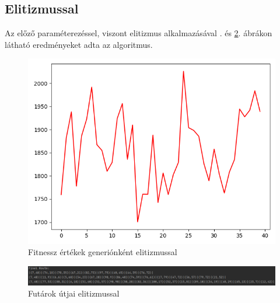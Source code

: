 \subsection{Elitizmussal}

Az előző paraméterezéssel, viszont elitizmus alkalmazásával . és \ref{fig:MTSPMultiDepo2Route}. ábrákon látható eredményeket adta az algoritmus.

\begin{figure}[!htb]
\centering
\includegraphics[scale=0.7]{images/MTSPMultiDepo2.png}
\caption{Fitnessz értékek generiónként elitizmussal}
\label{fig:MTSPMultiDepo2}
\end{figure}

\begin{figure}[!htb]
\centering
\includegraphics[width=\textwidth]{images/MTSPMultiDepo2Route.png}
\caption{Futárok útjai elitizmussal}
\label{fig:MTSPMultiDepo2Route}
\end{figure}
